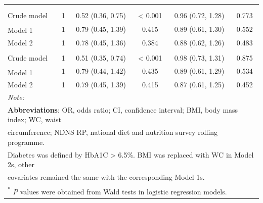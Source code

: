\begin{table}[H]
\begin{tabular}[t]{lccccc}
		\addlinespace[0.3em]
		\multicolumn{6}{l}{\textbf{Women (n = 3618)}}\\
		\addlinespace[0.3em]
		\multicolumn{6}{l}{\hspace{1em}\textbf{Hypertension}}\\
		\hspace{1em}\hspace{1em}Crude model & 1 & 0.52 (0.36, 0.75) & < 0.001 & 0.96 (0.72, 1.28) & 0.773\\
		\hspace{1em}\hspace{1em}Model 1\textsuperscript{\ddag} & 1 & 0.79 (0.45, 1.39) & 0.415 & 0.89 (0.61, 1.30) & 0.552\\
		\hspace{1em}\hspace{1em}Model 2 & 1 & 0.78 (0.45, 1.36) & 0.384 & 0.88 (0.62, 1.26) & 0.483\\
		\addlinespace[0.3em]
		\multicolumn{6}{l}{\hspace{1em}\textbf{Hypertension in non-diabetics}}\\
		\hspace{1em}\hspace{1em}Crude model & 1 & 0.51 (0.35, 0.74) & < 0.001 & 0.98 (0.73, 1.31) & 0.875\\
		\hspace{1em}\hspace{1em}Model 1\textsuperscript{\ddag} & 1 & 0.79 (0.44, 1.42) & 0.435 & 0.89 (0.61, 1.29) & 0.534\\
		\hspace{1em}\hspace{1em}Model 2 & 1 & 0.79 (0.45, 1.39) & 0.415 & 0.87 (0.61, 1.25) & 0.452\\
		\bottomrule
		\multicolumn{6}{l}{{\scriptsize \textit{Note: }}}\\
		\multicolumn{6}{l}{{\scriptsize \textbf{Abbreviations}: OR, odds ratio; CI, confidence interval; BMI, body mass index; WC, waist}}\\
		\multicolumn{6}{l}{{\scriptsize  circumference; NDNS RP, national diet and nutrition survey rolling programme.}}\\
		\multicolumn{6}{l}{{\scriptsize Diabetes was defined by HbA1C > 6.5\%. BMI was replaced with WC in Model 2s, other}}\\
		\multicolumn{6}{l}{{\scriptsize covariates remained the same with the corresponding Model 1s.}}\\
		\multicolumn{6}{l}{{\scriptsize \textsuperscript{*} \textit{P} values were obtained from Wald tests in logistic regression models.}}\\ 

\end{tabular}
\end{table}
